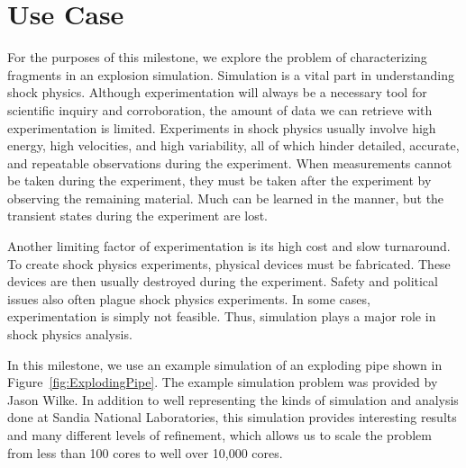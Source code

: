 \section{Use Case}
\label{sec:UseCase}

For the purposes of this milestone, we explore the problem of
characterizing fragments in an explosion simulation.  Simulation is a vital
part in understanding shock physics.  Although experimentation will always
be a necessary tool for scientific inquiry and corroboration, the amount of
data we can retrieve with experimentation is limited.  Experiments in shock
physics usually involve high energy, high velocities, and high variability,
all of which hinder detailed, accurate, and repeatable observations during
the experiment.  When measurements cannot be taken during the experiment,
they must be taken after the experiment by observing the remaining
material.  Much can be learned in the manner, but the transient states
during the experiment are lost.

Another limiting factor of experimentation is its high cost and slow
turnaround.  To create shock physics experiments, physical devices must be
fabricated.  These devices are then usually destroyed during the
experiment.  Safety and political issues also often plague shock physics
experiments.  In some cases, experimentation is simply not feasible.  Thus,
simulation plays a major role in shock physics analysis.

In this milestone, we use an example simulation of an exploding pipe shown
in Figure~\ref{fig:ExplodingPipe}.  The example simulation problem was 
provided by Jason Wilke.  In addition to well representing the kinds of
simulation and analysis done at Sandia National Laboratories, this simulation
provides interesting results and many different levels of refinement, which
allows us to scale the problem from less than 100 cores to well over 10,000
cores.

